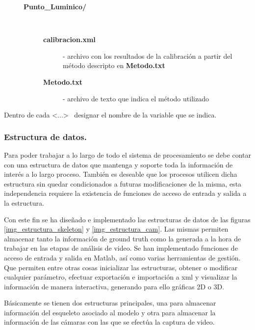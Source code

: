 \begin{description}
\begin{description}
\begin{description}
						\end{description} 
	\item[{\small\textbf{\textsf{Punto\_Luminico/}}}] \hfill \hfill \\ \vspace{-0.5cm}
							\begin{description}
									\item[{\small\textbf{\textsf{calibracion.xml}}}] - archivo con los resultados de la calibración a partir del método descripto en {\small\textbf{\textsf{Metodo.txt}}}
									\item[{\small\textbf{\textsf{Metodo.txt}}}] - archivo de texto que indica el método utilizado									
							\end{description} 
	\end{description} 
\end{description}

Dentro de cada <...>  ~designar el nombre de la variable que se indica.


\subsubsection{Estructura de datos.}
\label{section_Estructura_de_datos}
Para poder trabajar a lo largo de todo el sistema de procesamiento se debe contar con una estructura de datos que mantenga y soporte toda la información de interés a lo largo proceso. También es deseable que los procesos utilicen dicha estructura sin quedar condicionados a futuras modificaciones de la misma, esta independencia requiere la existencia de funciones de acceso de entrada y salida a la estructura.  


Con este fin se ha diseñado e implementado las estructuras de datos de las figuras \ref{img_estructura_skeleton} y \ref{img_estructura_cam}.
Las mismas permiten almacenar tanto la información de ground truth como la generada a la hora de  trabajar en las etapas de análisis de video. Se han implementado funciones de acceso de entrada y salida en Matlab, así como varias herramientas de gestión. Que permiten entre otras cosas inicializar las estructuras, obtener o modificar cualquier parámetro, efectuar exportación e importación a xml y visualizar la información de manera interactiva, generando para ello gráficas 2D o 3D. 


Básicamente se tienen dos estructuras principales, una para almacenar información del esqueleto asociado al modelo y otra para almacenar la información de las cámaras con las que se efectúa la captura de video.

